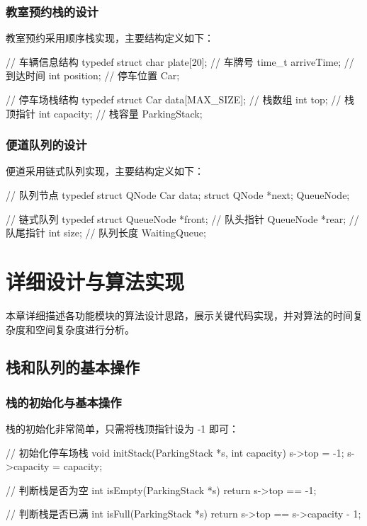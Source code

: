 \documentclass[a4paper,12pt,twoside]{ctexrep}
\begin{document}
\subsection{教室预约栈的设计}

教室预约采用顺序栈实现，主要结构定义如下：

\begin{codeblock}
// 车辆信息结构
typedef struct {
    char plate[20];     // 车牌号
    time_t arriveTime;  // 到达时间
    int position;       // 停车位置
} Car;

// 停车场栈结构
typedef struct {
    Car data[MAX_SIZE]; // 栈数组
    int top;            // 栈顶指针
    int capacity;       // 栈容量
} ParkingStack;
\end{codeblock}

\subsection{便道队列的设计}

便道采用链式队列实现，主要结构定义如下：

\begin{codeblock}
// 队列节点
typedef struct QNode {
    Car data;
    struct QNode *next;
} QueueNode;

// 链式队列
typedef struct {
    QueueNode *front;  // 队头指针
    QueueNode *rear;   // 队尾指针
    int size;          // 队列长度
} WaitingQueue;
\end{codeblock}

\cleardoublepage
\chapter{详细设计与算法实现}

本章详细描述各功能模块的算法设计思路，展示关键代码实现，并对算法的时间复杂度和空间复杂度进行分析。

\section{栈和队列的基本操作}

\subsection{栈的初始化与基本操作}

栈的初始化非常简单，只需将栈顶指针设为 -1 即可：

\begin{codeblock}
// 初始化停车场栈
void initStack(ParkingStack *s, int capacity) {
    s->top = -1;
    s->capacity = capacity;
}

// 判断栈是否为空
int isEmpty(ParkingStack *s) {
    return s->top == -1;
}

// 判断栈是否已满
int isFull(ParkingStack *s) {
    return s->top == s->capacity - 1;
}
\end{codeblock}
\end{document}
